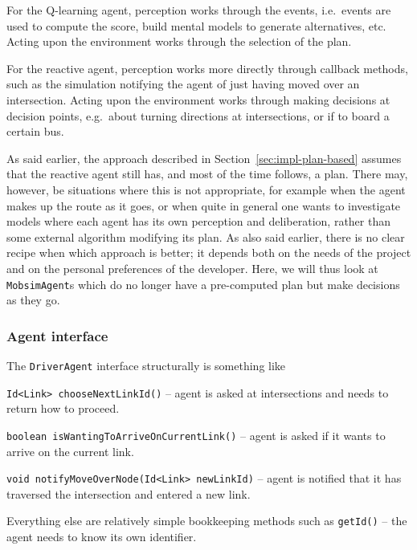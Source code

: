 For the Q-learning agent, perception works through the events, i.e.\ events are used to compute the score, build mental models to generate alternatives, etc.  Acting upon the environment works through the selection of the plan.

For the reactive agent, perception works more directly through callback methods, such as the simulation notifying the agent of just having moved over an intersection.  Acting upon the environment works through making decisions at decision points, e.g.\ about turning directions at intersections, or if to board a certain bus.

As said earlier, the approach described in Section~\ref{sec:impl-plan-based} assumes that the reactive agent still has, and most of the time follows, a plan.  There may, however, be situations where this is not appropriate, for example when the agent makes up the route as it goes, or when quite in general one wants to investigate models where each agent has its own perception and deliberation, rather than some external algorithm modifying its plan.  As also said earlier, there is no clear recipe when which approach is better; it depends both on the needs of the project and on the personal preferences of the developer.
%
Here, we will thus look at \verb$MobsimAgent$s which do no longer have a pre-computed plan but make decisions as they go.

\subsubsection{Agent interface}

The \verb$DriverAgent$ interface structurally is something like
\begin{compactitem}

\item \verb$Id<Link> chooseNextLinkId()$ -- agent is asked at intersections and needs to return how to proceed.




\item \verb$boolean isWantingToArriveOnCurrentLink()$ -- agent is asked if it wants to arrive on the current link.

\item \verb$void notifyMoveOverNode(Id<Link> newLinkId)$ -- agent is notified that it has traversed the intersection and entered a new link.

\end{compactitem}
Everything else are relatively simple bookkeeping methods such as \verb$getId()$ -- the agent needs to know its own identifier.

